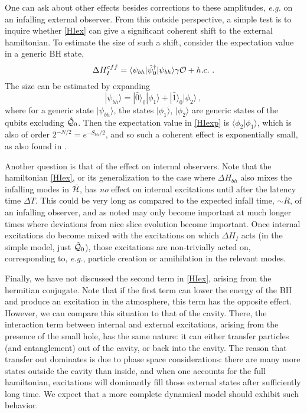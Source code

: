 \documentclass[11pt]{article}
\numberwithin{equation}{section}
\newcommand{\calo}{{\cal O}}
\newcommand{\calh}{{\cal H}}
\newcommand{\calq}{{\cal Q}}
\newcommand{\beq}{\begin{equation}}
\newcommand{\eeq}{\end{equation}}
\begin{document}
One can ask about other effects besides corrections to these amplitudes, {\it e.g.} on an infalling external observer.  From this outside perspective, a simple test is to inquire whether  \eqref{HIex} can give a significant coherent shift to the external hamiltonian.  To estimate the size of such a shift, consider the expectation value in a generic BH state,
\beq\label{HIexp}
\Delta H_I^{eff} = \langle \psi_{bh}|\hat \psi_0^\dagger| \psi_{bh}\rangle \gamma \calo + h.c.\ .
\eeq
The size can be estimated by expanding 
\beq
|\psi_{bh}\rangle = |\hat0\rangle_0 |\phi_1\rangle +  |\hat1\rangle_0  |\phi_2\rangle\ ,
\eeq
where for a generic state $|\psi_{bh}\rangle$, the states $ |\phi_1\rangle$, $ |\phi_2\rangle$ are generic states of the qubits excluding $\hat \calq_0$. Then the expectation value in \eqref{HIexp} is $\langle \phi_2|\phi_1\rangle$, which is also of order $2^{-N/2} = e^{-S_{bh}/2}$, and so such a coherent effect is exponentially small, as also found in \cite{NVU}.

Another question is that of the effect on internal observers.  Note that the hamiltonian \eqref{HIex}, or its generalization to the case where  $\Delta H_{bh}$ also mixes  the infalling modes in $\tilde \calh$, has {\it no} effect on internal excitations until after the latency time $\Delta T$.  This could be very long as compared to the expected infall time, $\sim R$, of an infalling observer, and as noted may only become important at much longer times where deviations from nice slice evolution become important.  Once internal excitations do become mixed with the excitations on which $\Delta H_I$ acts (in the simple model, just $\hat \calq_0$), those excitations are non-trivially acted on, corresponding to, {\it e.g.}, particle creation or annihilation in the relevant modes.

Finally, we have not discussed the second term in \eqref{HIex}, arising from the hermitian conjugate.  Note that if the first term can lower the energy of the BH and produce an excitation in the atmosphere, this term has the opposite effect.  However, we can compare this situation to that of the cavity.  There, the interaction term between internal and external excitations, arising from the presence of the small hole, has the same nature: it can either transfer particles (and entanglement) out of the cavity, or back into the cavity.  The reason that transfer out dominates is due to phase space considerations:  there are many more states outside the cavity than inside, and when one accounts for the full hamiltonian, excitations will dominantly fill those external states after sufficiently long time.  We expect that a more complete dynamical model should exhibit such behavior.
\end{document}
